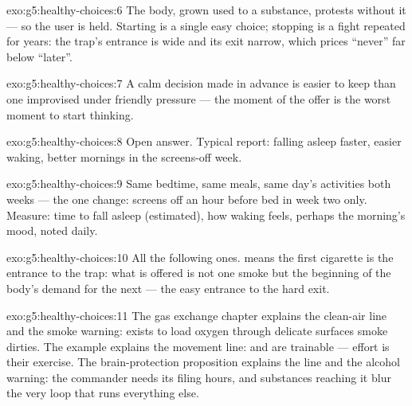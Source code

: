\begin{solution}{exo:g5:healthy-choices:6}
The body, grown used to a substance, protests without it ---
so the user is held. Starting is a single easy choice;
stopping is a fight repeated for years: the trap's entrance
is wide and its exit narrow, which prices ``never'' far
below ``later''.
\end{solution}

\begin{solution}{exo:g5:healthy-choices:7}
A calm decision made in advance is easier to keep than one
improvised under friendly pressure --- the moment of the
offer is the worst moment to start thinking.
\end{solution}

\begin{solution}{exo:g5:healthy-choices:8}
Open answer. Typical report: falling asleep faster, easier
waking, better mornings in the screens-off week.
\end{solution}

\begin{solution}{exo:g5:healthy-choices:9}
Same bedtime, same meals, same day's activities both weeks
--- the one change: screens off an hour before bed in week
two only. Measure: time to fall asleep (estimated), how
waking feels, perhaps the morning's mood, noted daily.
\end{solution}

\begin{solution}{exo:g5:healthy-choices:10}
All the following ones.  means the first cigarette
is the entrance to the trap: what is offered is not one
smoke but the beginning of the body's demand for the next
--- the easy entrance to the hard exit.
\end{solution}

\begin{solution}{exo:g5:healthy-choices:11}
The gas exchange chapter explains the clean-air line and the
smoke warning:  exists to load oxygen through
delicate surfaces smoke dirties. The  example
explains the movement line:  and  are trainable ---
effort is their exercise. The brain-protection proposition
explains the  line and the alcohol warning: the
commander needs its filing hours, and substances reaching it
blur the very loop that runs everything else.
\end{solution}
